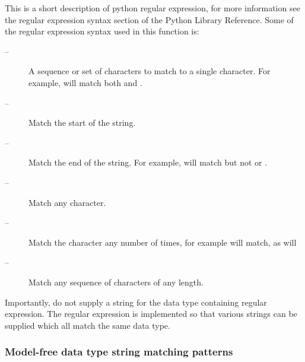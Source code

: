 This is a short description of python  regular expression,  for more information see the
regular expression  syntax section of the Python  Library Reference.  Some of the regular
expression syntax used in this function is:

\begin{description}
\item[    
 --]   A sequence  or set of characters to match to a single character.  For example, 
 will match both 
 and 
. 
\item[    
 --]   Match the start of the string. 
\item[    
 --]   Match the end of the string.  For example, 
 will match 
 but not 
 or 
. 
\item[    
 --]   Match any character. 
\item[    
 --]   Match the character 
 any number of times, for example 
 will match, as will 
 
\item[    
 --]   Match any sequence  of characters of any length. 
\end{description}
Importantly, do not supply a string for the data type containing regular expression.   The
regular expression  is implemented so that various strings can be supplied which all match
the same data type.


\subsubsection{Model-free data type string matching patterns}



